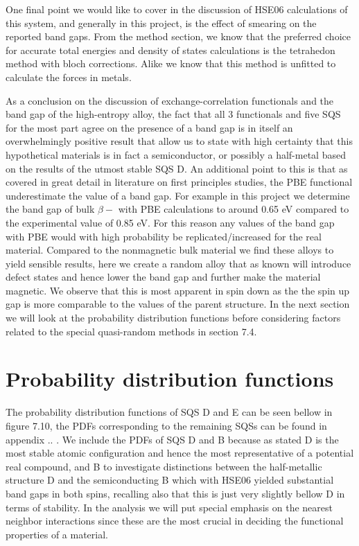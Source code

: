  
One final point we would like to cover in the discussion of HSE06 calculations of this system, and generally in this project, is the effect of smearing on the reported band gaps. From the method section, we know that the preferred choice for accurate total energies and density of states calculations is the tetrahedon method with bloch corrections. Alike we know that this method is unfitted to calculate the forces in metals.

As a conclusion on the discussion of exchange-correlation functionals and the band gap of the  high-entropy alloy, the fact that all 3 functionals and five SQS for the most part agree on the presence of a band gap is in itself an overwhelmingly positive result that allow us to state with high certainty that this hypothetical materials is in fact a semiconductor, or possibly a half-metal based on the results of the utmost stable SQS D. An additional point to this is that as covered in great detail in literature on first principles studies, the PBE functional underestimate the value of a band gap. For example in this project we determine the band gap of bulk $\beta-$ with PBE calculations to around 0.65 eV compared to the experimental value of 0.85 eV. For this reason any values of the band gap with PBE would with high probability be replicated/increased for the real material. Compared to the nonmagnetic bulk material we find these alloys to yield sensible results, here we create a random alloy that as known will introduce defect states and hence lower the band gap and further make the material magnetic. We observe that this is most apparent in spin down as the the spin up gap is more comparable to the values of the parent  structure. In the next section we will look at the probability distribution functions before considering factors related to the special quasi-random methods in section 7.4. 


\newpage
\section{Probability distribution functions}
The probability distribution functions of SQS D and E can be seen bellow in figure 7.10, the PDFs corresponding to the remaining SQSs can be found in appendix .. . We include the PDFs of SQS D and B because as stated D is the most stable atomic configuration and hence the most representative of a potential real compound, and B to investigate distinctions between the half-metallic structure D and the semiconducting B which with HSE06 yielded substantial band gaps in both spins, recalling also that this is just very slightly bellow D in terms of stability. In the analysis we will put special emphasis on the nearest neighbor interactions since these are the most crucial in deciding the functional properties of a material. 
 
